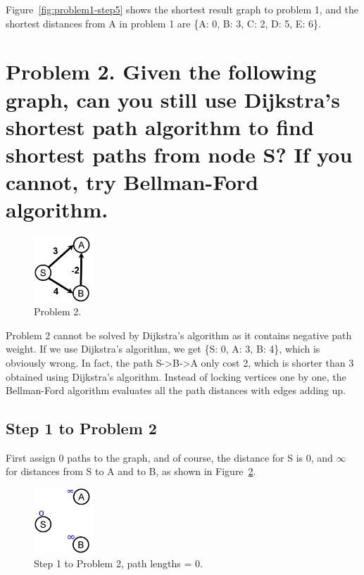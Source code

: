 \documentclass[doc,natbib,12pt]{article}
\begin{document}
	Figure~\ref{fig:problem1-step5} shows the shortest result graph to problem 1, and the shortest distances from A in problem 1 are \{A: 0, B: 3, C: 2, D: 5, E: 6\}.
	
	\section*{Problem 2. Given the following graph, can you still use Dijkstra's shortest path algorithm to find shortest paths from node S? If you cannot, try Bellman-Ford algorithm.}
	
	\begin{figure}[htpb]
		\centering
		\includegraphics[width=0.2\textwidth]{2.png}
		\caption{\label{fig:problem2}Problem 2.}
	\end{figure}
	
	Problem 2 cannot be solved by Dijkstra's algorithm as it contains negative path weight. If we use Dijkstra's algorithm, we get \{S: 0, A: 3, B: 4\}, which is obviously wrong. In fact, the path S->B->A only cost 2, which is shorter than 3 obtained using Dijkstra's algorithm. Instead of locking vertices one by one, the Bellman-Ford algorithm evaluates all the path distances with edges adding up. 
	
	\subsection*{Step 1 to Problem 2}
	
	First assign 0 paths to the graph, and of course, the distance for S is 0, and $\infty$ for distances from S to A and to B, as shown in Figure~\ref{fig:problem2-step1}.
	
	\begin{figure}[htpb]
		\centering
		\includegraphics[width=0.2\textwidth]{2-1.png}
		\caption{\label{fig:problem2-step1}Step 1 to Problem 2, path lengths = 0.}
	\end{figure}
	
\end{document}
